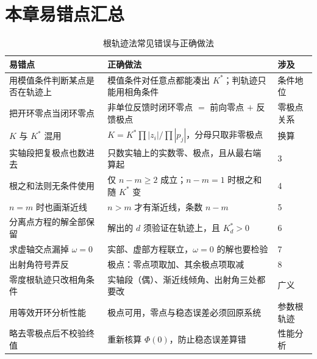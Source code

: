 \section{本章易错点汇总}
{\renewcommand{\arraystretch}{1.35}\setlength{\tabcolsep}{6pt}
\begin{table}[htbp]
\centering
\caption{根轨迹法常见错误与正确做法}
\begin{tabular}{@{}p{4.3cm}p{7.0cm}p{2.5cm}@{}}
\toprule
易错点 & 正确做法 & 涉及 \\
\midrule
用模值条件判断某点是否在轨迹上 & 模值条件对任意点都能凑出 $K^*$；判轨迹只能用相角条件 & 条件地位 \\
把开环零点当闭环零点 & 非单位反馈时闭环零点 $=$ 前向零点 $+$ 反馈极点 & 零极点关系 \\
$K$ 与 $K^*$ 混用 & $K=K^*\prod|z_i|/\prod|p_j|$，分母只取非零极点 & 换算 \\
实轴段把复极点也数进去 & 只数实轴上的实数零、极点，且从最右端算起 & 3 \\
根之和法则无条件使用 & 仅 $n-m\ge2$ 成立；$n-m=1$ 时根之和随 $K^*$ 变 & 4 \\
$n=m$ 时也画渐近线 & $n>m$ 才有渐近线，条数 $n-m$ & 5 \\
分离点方程的解全部保留 & 解出的 $d$ 须验证在轨迹上，且 $K^*_d>0$ & 6 \\
求虚轴交点漏掉 $\omega=0$ & 实部、虚部方程联立，$\omega=0$ 的解也要检验 & 7 \\
出射角符号弄反 & 极点：零点项取加、其余极点项取减 & 8 \\
零度根轨迹只改相角条件 & 实轴段（偶）、渐近线倾角、出射角三处都要改 & 广义 \\
用等效开环分析性能 & 极点可用，零点与稳态误差必须回原系统 & 参数根轨迹 \\
略去零极点后不校验终值 & 重新核算 $\Phi(0)$，防止稳态误差算错 & 性能分析 \\
\bottomrule
\end{tabular}
\end{table}}

\setlength{\parskip}{0pt plus 1pt}
\renewcommand{\arraystretch}{1}
\setlength{\tabcolsep}{6pt}
